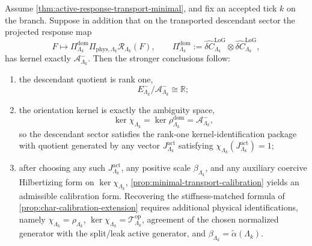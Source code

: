 \documentclass[11pt]{article}
\begin{document}
\begin{theorem}
\label{thm:active-response-transport-strong}
Assume \cref{thm:active-response-transport-minimal}, and fix an accepted tick \(k\) on the branch.
Suppose in addition that on the transported
descendant sector the projected response map
\[
F\longmapsto
\Pi^{\mathrm{dom}}_{\Lambda_k}\Pi_{\mathrm{phys},\Lambda_k}\mathcal R_{\Lambda_k}(F),
\qquad
\Pi^{\mathrm{dom}}_{\Lambda_k}
:=
\widehat{\delta C}^{\mathrm{LoG}}_{\Lambda_k}\otimes
\widehat{\delta C}^{\mathrm{LoG}}_{\Lambda_k},
\]
has kernel exactly \(\mathcal A^-_{\Lambda_k}\).
Then the stronger conclusions follow:
\begin{enumerate}[leftmargin=2em]
\item the descendant quotient is rank one,
  \[
  E^-_{\Lambda_k}/\mathcal A^-_{\Lambda_k}\cong \mathbb R;
  \]
\item the orientation kernel is exactly the ambiguity space,
  \[
  \ker\chi_{\Lambda_k}
  =
  \ker\rho^{\mathrm{dom}}_{\Lambda_k}
  =
  \mathcal A^-_{\Lambda_k},
  \]
  so the descendant sector satisfies the rank-one kernel-identification package with quotient
  generated by any vector \(J^{\mathrm{act}}_{\Lambda_k}\) satisfying
  \(\chi_{\Lambda_k}(J^{\mathrm{act}}_{\Lambda_k})=1\);
  \item after choosing any such \(J^{\mathrm{act}}_{\Lambda_k}\), any positive scale
  \(\beta_{\Lambda_k}\), and any auxiliary coercive Hilbertizing form on
  \(\ker\chi_{\Lambda_k}\), \cref{prop:minimal-transport-calibration} yields an admissible
  calibration form.
  Recovering the stiffness-matched formula of \cref{prop:char-calibration-extension} requires
  additional physical identifications, namely
  \(\chi_{\Lambda_k}=\rho_{\Lambda_k}\), \(\ker\chi_{\Lambda_k}=\mathcal T^{\mathrm{op}}_{\Lambda_k}\),
  agreement of the chosen normalized generator with the split/leak active generator, and
  \(\beta_{\Lambda_k}=\widetilde\alpha(\Lambda_k)\).
\end{enumerate}
\end{theorem}
\end{document}

